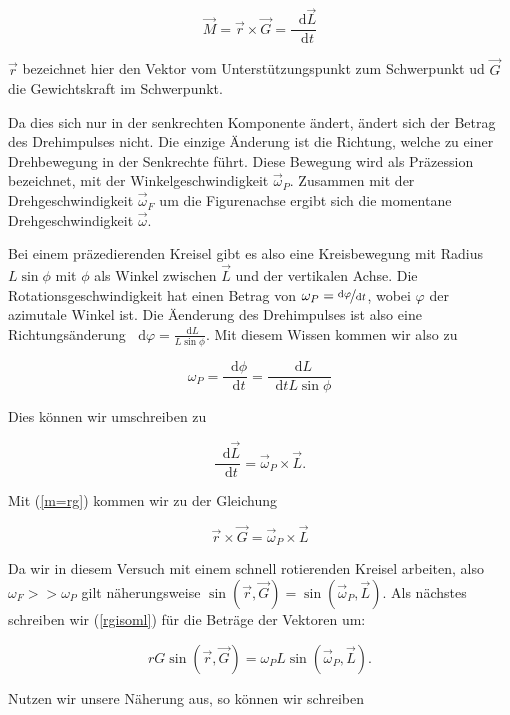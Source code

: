 \documentclass[11pt,a4paper]{article}
\newcommand{\dif}{\mathop{}\!\mathrm{d}}
\newcommand{\vphi}{\varphi}
\begin{document}
\begin{equation}
\vec{M}=\vec{r}\times\vec{G}=\frac{\dif\vec{L}}{\dif t}\label{m=rg}
\end{equation}

$\vec{r}$ bezeichnet hier den Vektor vom Unterst\"utzungspunkt zum Schwerpunkt ud $\vec{G}$ die Gewichtskraft im Schwerpunkt.

Da dies sich nur in der senkrechten Komponente \"andert, \"andert sich der Betrag des Drehimpulses nicht. Die einzige \"Anderung ist die Richtung, welche zu einer Drehbewegung in der Senkrechte f\"uhrt. Diese Bewegung wird als Pr\"azession bezeichnet, mit der Winkelgeschwindigkeit $\vec{\omega}_P$. Zusammen mit der Drehgeschwindigkeit $\vec{\omega}_F$ um die Figurenachse ergibt sich die momentane Drehgeschwindigkeit $\vec{\omega}$.

Bei einem pr\"azedierenden Kreisel gibt es also eine Kreisbewegung mit Radius $L\sin\phi$ mit $\phi$ als Winkel zwischen $\vec{L}$ und der vertikalen Achse. Die Rotationsgeschwindigkeit hat einen Betrag von $\omega_P=\nicefrac{\dif\vphi}{\dif t}$, wobei $\vphi$ der azimutale Winkel ist. Die \"Aenderung des Drehimpulses ist also eine Richtungs\"anderung $\dif\vphi=\frac{\dif L}{L\sin\phi}$. Mit diesem Wissen kommen wir also zu

\[
\omega_P=\frac{\dif\phi}{\dif t}=\frac{\dif L}{\dif tL\sin\phi}
\]

Dies k\"onnen wir umschreiben zu

\begin{equation}
\frac{\dif\vec{L}}{\dif t}=\vec{\omega}_P\times\vec{L}.
\end{equation}

Mit (\ref{m=rg}) kommen wir zu der Gleichung

\begin{equation}
\vec{r}\times\vec{G}=\vec{\omega}_P\times\vec{L}\label{rgisoml}
\end{equation}

Da wir in diesem Versuch mit einem schnell rotierenden Kreisel arbeiten, also $\omega_F>>\omega_P$ gilt n\"aherungsweise $\sin(\vec{r},\vec{G})=\sin(\vec{\omega}_P,\vec{L})$. Als n\"achstes schreiben wir (\ref{rgisoml}) f\"ur die Betr\"age der Vektoren um:

\begin{equation}
rG\sin(\vec{r},\vec{G})=\omega_PL\sin(\vec{\omega}_P,\vec{L}).
\end{equation}

Nutzen wir unsere N\"aherung aus, so k\"onnen wir schreiben
\end{document}
